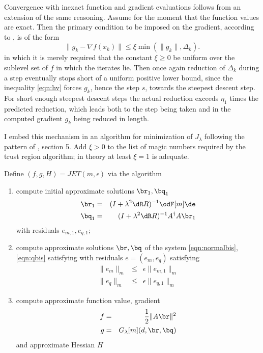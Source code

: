 Convergence with inexact function and gradient evaluations follows
from an extension of the same reasoning. Assume for the moment that
the function values are exact. Then the primary condition to be imposed on the
gradient, according to \cite{HeinkenVicente:01b}, is of the form
\begin{equation}
\label{eqn:hv}
\|g_k - \nabla f(x_k)\| \le \xi \min(\|g_k\|,\Delta_k).
\end{equation}
in which it is merely required that the constant $\xi \ge 0$ be
uniform over the sublevel set of $f$ in which the iterates lie. Then
once again reduction of $\Delta_k$ during a step eventually stops
short of a uniform positive lower bound, since the inequality
\ref{eqn:hv} forces $g_k$, hence the step $s$, towards the steepest
descent step. For short enough steepest descent steps the
actual reduction exceeds $\eta_1$ times the predicted reduction, which
leads both to the step being taken and in the computed gradient $g_k$
being reduced in length.

I embed this mechanism in an algorithm for minimization of
$J_{\lambda}$ following the pattern of \cite{HeinkenVicente:01b},
section 5. Add $\xi >0$ to the list of magic numbers required by the
trust region algorithm; in theory at least $\xi=1$ is adequate. 

Define $(f,g,H) = JET(m,\epsilon)$ via the algorithm

  \begin{enumerate}
    \item compute initial approximate solutions $\br_1,\bq_1$
      \begin{eqnarray}
      \label{eqn:krylov1alg}
      \br_1& =& (I+\lambda^2\dR R)^{-1}\odF[m]\de\\
      \bq_1&=&(I+\lambda^2 \dR R)^{-1}A^{\dagger}A\br_1
      \end{eqnarray}
       with residuals $e_{m,1}, e_{q,1}$;
    \item compute approximate solutions $\br,\bq$ of the system
      \ref{eqn:normalbis},\ref{eqn:qbis} satisfying with residuals
      $e=(e_{m}, e_{q})$ satisfying
      \begin{eqnarray}
      \label{eqn:mresnalg}
      \|e_{m}\|_m & \le & \epsilon \|e_{m,1}\|_m\\
      \|e_{q}\|_m & \le & \epsilon \|e_{q,1}\|_m 
      \end{eqnarray}
    \item compute approximate function value, gradient
      \begin{eqnarray}
      \label{eqn:fgalg}
      f& =& \frac{1}{2}\|A\br\|^2 \\
      g& = & G_{\lambda}[m](d,\br,\bq)
      \end{eqnarray}
      and approximate Hessian $H$
  \end{enumerate}

